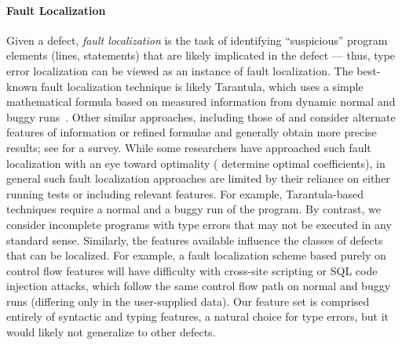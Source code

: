 \paragraph{Fault Localization}
%
Given a defect, \emph{fault localization} is the task of identifying
``suspicious'' program elements (\eg lines, statements) that are likely
implicated in the defect %
%
--- thus, type error localization can be viewed as an instance of fault
localization.
%
The best-known fault localization technique is likely Tarantula, which
uses a simple mathematical formula based on measured information from
dynamic normal and buggy runs~\citep{Jones2002-us}.
%
Other similar approaches, including those of \citet{Chen2002-qz} and
\citet{Abreu2006-fn,Abreu2007-mu} consider alternate features of
information or refined formulae and generally obtain more precise
results; see \citet{Wong2009-pd} for a survey.
%
While some researchers have approached such fault localization with an
eye toward optimality (\eg \citet{Yoo2013-rw} determine optimal
coefficients), in general such fault localization approaches are limited
by their reliance on either running tests or including relevant
features.
%
For example, Tarantula-based techniques require a normal and a buggy run
of the program.
%
By contrast, we consider incomplete programs with type errors that may
not be executed in any standard sense.
%
Similarly, the features available influence the classes of defects that
can be localized.
%
For example, a fault localization scheme based purely on control flow features
will have difficulty with cross-site scripting or SQL code injection
attacks, which follow the same control flow path on normal and buggy
runs (differing only in the user-supplied data).
%
Our feature set is comprised entirely of syntactic and typing features,
a natural choice for type errors, but it would likely not
generalize to other defects.





